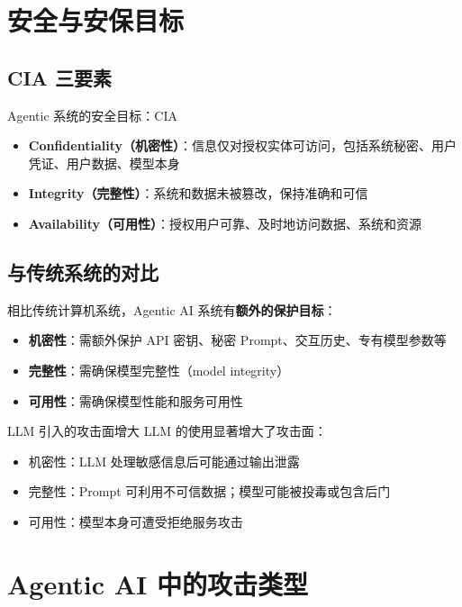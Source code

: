 \documentclass[a4paper]{article}
\begin{document}
\section{安全与安保目标}

\subsection{CIA 三要素}

\begin{importantbox}{Agentic 系统的安全目标：CIA}
\begin{itemize}
    \item \textbf{Confidentiality（机密性）}：信息仅对授权实体可访问，包括系统秘密、用户凭证、用户数据、模型本身
    \item \textbf{Integrity（完整性）}：系统和数据未被篡改，保持准确和可信
    \item \textbf{Availability（可用性）}：授权用户可靠、及时地访问数据、系统和资源
\end{itemize}
\end{importantbox}

\subsection{与传统系统的对比}

相比传统计算机系统，Agentic AI 系统有\textbf{额外的保护目标}：
\begin{itemize}
    \item \textbf{机密性}：需额外保护 API 密钥、秘密 Prompt、交互历史、专有模型参数等
    \item \textbf{完整性}：需确保模型完整性（model integrity）
    \item \textbf{可用性}：需确保模型性能和服务可用性
\end{itemize}

\begin{warningbox}{LLM 引入的攻击面增大}
LLM 的使用显著增大了攻击面：
\begin{itemize}
    \item 机密性：LLM 处理敏感信息后可能通过输出泄露
    \item 完整性：Prompt 可利用不可信数据；模型可能被投毒或包含后门
    \item 可用性：模型本身可遭受拒绝服务攻击
\end{itemize}
\end{warningbox}

\section{Agentic AI 中的攻击类型}
\end{document}
